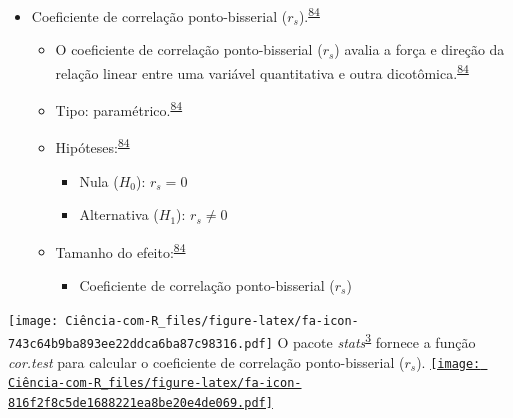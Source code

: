\documentclass[
]{book}
\providecommand{\tightlist}{%
  \setlength{\itemsep}{0pt}\setlength{\parskip}{0pt}}
\begin{document}
\begin{itemize}
\item
  Coeficiente de correlação ponto-bisserial (\(r_{s}\)).\textsuperscript{\protect\hyperlink{ref-khamis2008}{84}}

  \begin{itemize}
  \item
    O coeficiente de correlação ponto-bisserial (\(r_{s}\)) avalia a força e direção da relação linear entre uma variável quantitativa e outra dicotômica.\textsuperscript{\protect\hyperlink{ref-khamis2008}{84}}
  \item
    Tipo: paramétrico.\textsuperscript{\protect\hyperlink{ref-khamis2008}{84}}
  \item
    Hipóteses:\textsuperscript{\protect\hyperlink{ref-khamis2008}{84}}

    \begin{itemize}
    \item
      Nula (\(H_{0}\)): \(r_{s}=0\)
    \item
      Alternativa (\(H_{1}\)): \(r_{s}≠0\)
    \end{itemize}
  \item
    Tamanho do efeito:\textsuperscript{\protect\hyperlink{ref-khamis2008}{84}}

    \begin{itemize}
    \tightlist
    \item
      Coeficiente de correlação ponto-bisserial (\(r_{s}\))
    \end{itemize}
  \end{itemize}
\end{itemize}

\texttt{[image: Ciência-com-R\_files/figure-latex/fa-icon-743c64b9ba893ee22ddca6ba87c98316.pdf]} O pacote \emph{stats}\textsuperscript{\protect\hyperlink{ref-stats-2}{3}} fornece a função \emph{cor.test} para calcular o coeficiente de correlação ponto-bisserial (\(r_{s}\)). \href{https://rdocumentation.org/packages/stats/versions/3.6.2}{\texttt{[image: Ciência-com-R\_files/figure-latex/fa-icon-816f2f8c5de1688221ea8be20e4de069.pdf]}}
\end{document}
